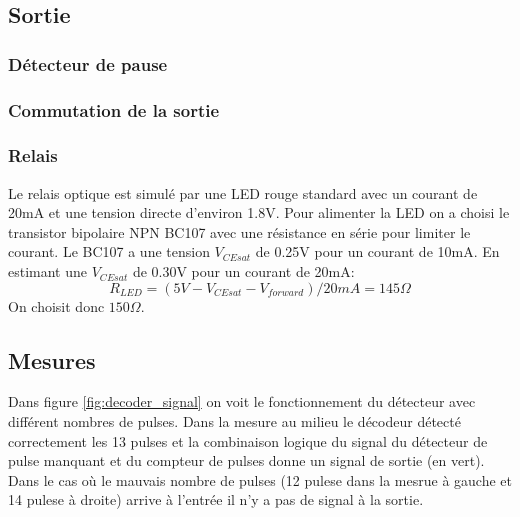 \documentclass[french]{layout/Report}
\begin{document}
\subsection{Sortie}

\subsubsection{Détecteur de pause}

\subsubsection{Commutation de la sortie}
\subsubsection{Relais}
Le relais optique est simulé par une LED rouge standard avec un courant de 20mA et une tension directe d'environ 1.8V.
Pour alimenter la LED on a choisi le transistor bipolaire NPN BC107 avec une résistance en série pour limiter le courant.
Le BC107 a une tension \(V_{CEsat}\) de 0.25V pour un courant de 10mA.
En estimant une \(V_{CEsat}\) de 0.30V pour un courant de 20mA:
\[
R_{LED} = (5V - V_{CEsat} - V_{forward})/20mA = 145\Omega
\]
On choisit donc \(150\Omega\).

\subsection{Mesures}

Dans figure \ref{fig:decoder_signal} on voit le fonctionnement du détecteur avec différent nombres de pulses.
Dans la mesure au milieu le décodeur détecté correctement les 13 pulses et la combinaison logique
du signal du détecteur de pulse manquant et du compteur de pulses donne un signal de sortie (en vert).
Dans le cas où le mauvais nombre  de pulses (12 pulese dans la mesrue à gauche et 14 pulese à droite)
arrive à l'entrée il n'y a pas de signal à la sortie.
\end{document}
